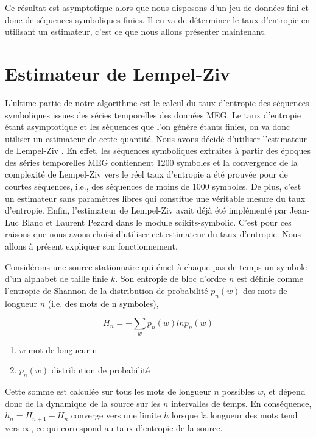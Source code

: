 Ce résultat est asymptotique alors que nous disposons d'un jeu de données fini et donc de séquences symboliques finies. Il en va de déterminer le taux d'entropie en utilisant un estimateur, c'est ce que nous allons présenter maintenant. 

\section{Estimateur de Lempel-Ziv}

L'ultime partie de notre algorithme est le calcul du taux d'entropie des séquences symboliques issues des séries temporelles des données MEG. Le taux d'entropie étant asymptotique et les séquences que l'on génère étants finies, on va donc utiliser un estimateur de cette quantité. Nous avons décidé d'utiliser l'estimateur de Lempel-Ziv \cite{1}. En effet, les séquences symboliques extraites à partir des époques des séries temporelles MEG contiennent 1200 symboles et la convergence de la complexité de Lempel-Ziv vers le réel taux d'entropie a été prouvée \cite{1} pour de courtes séquences, i.e., des séquences de moins de 1000 symboles. De plus, c'est un estimateur sans paramètres libres qui constitue une véritable mesure du taux d'entropie. Enfin, l'estimateur de Lempel-Ziv avait déjà été implémenté par Jean-Luc Blanc et Laurent Pezard dans le module scikits-symbolic. C'est pour ces raisons que nous avons choisi d'utiliser cet estimateur du taux d'entropie. Nous allons à présent expliquer son fonctionnement.

\vspace{2mm}
Considérons une source stationnaire qui émet à chaque pas de temps un symbole d'un alphabet de taille finie $k$. Son entropie de bloc d'ordre $n$ est définie comme l'entropie de Shannon de la distribution de probabilité $p_n(w)$ des mots de longueur $n$ (i.e. des mots de n symboles),

\begin{equation}
    H_n = - \sum_{w}p_n(w)lnp_n(w)
\end{equation}

\begin{enumerate}
	\item $w$ mot de longueur n
	\item $p_n(w)$ distribution de probabilité
\end{enumerate}

Cette somme est calculée sur tous les mots de longueur $n$ possibles $w$, et dépend donc de la dynamique de la source sur les $n$ intervalles de temps.
En conséquence, $h_n = H_{n+1} - H_n$ converge vers une limite $h$ lorsque la longueur des mots tend vers $\infty$, ce qui correspond au taux d'entropie de la source.

